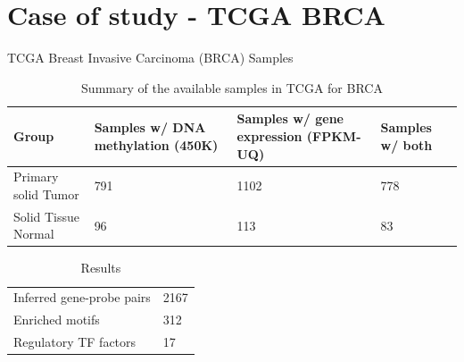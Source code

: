 \documentclass[slidestop,compress,11pt,xcolor=dvipsnames]{beamer}
\begin{document}
\section{Case of study - TCGA BRCA}


\begin{frame}{TCGA Breast Invasive Carcinoma (BRCA) Samples}
 \begin{table}[ht!]
  \centering
  \caption{Summary of the available samples in TCGA for BRCA}
  \scriptsize

  \begin{tabular}{p{2.3cm}p{2.4cm}p{2.4cm}p{1cm}}
   \toprule
   Group               & Samples w/ DNA methylation (450K) & Samples w/ gene expression (FPKM-UQ) & Samples w/ both \\ \midrule
   Primary solid Tumor & 791                               & 1102                                 & 778             \\
   Solid Tissue Normal & 96                                & 113                                  & 83              \\
   \bottomrule
  \end{tabular}
 \end{table}

 \begin{table}[ht!]
  \centering
  \caption{Results}
  \scriptsize

  \begin{tabular}{p{2.8cm}p{2.4cm}}
   \toprule
   Inferred gene-probe pairs & 2167 \\
   Enriched motifs           & 312  \\
   Regulatory TF factors     & 17   \\
   \bottomrule
  \end{tabular}
 \end{table}
\end{frame}
\end{document}
